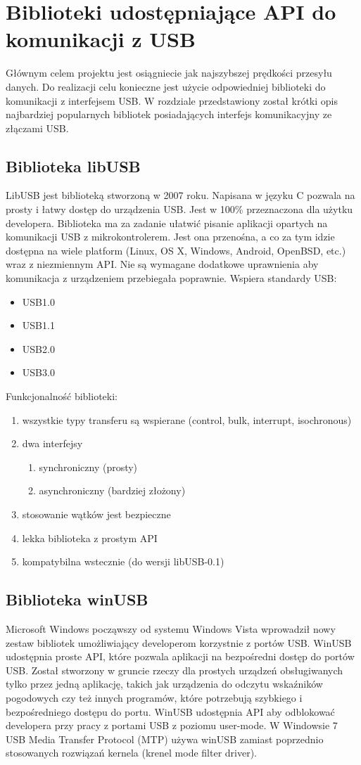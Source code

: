\documentclass{BscUS}
\begin{document}
\chapter{Biblioteki udostępniające API do komunikacji z USB}
\label{librariesChapter}
Głównym celem projektu jest osiągniecie jak najszybszej prędkości przesyłu danych. Do realizacji celu konieczne jest użycie odpowiedniej biblioteki do komunikacji z interfejsem USB. W rozdziale przedstawiony został krótki opis najbardziej popularnych bibliotek posiadających interfejs komunikacyjny ze złączami USB.
\section{Biblioteka libUSB}
LibUSB \cite{libusbDesc} jest biblioteką stworzoną w 2007 roku. Napisana w języku C  pozwala na prosty i łatwy dostęp do urządzenia USB. Jest w 100\% przeznaczona dla użytku developera. Biblioteka ma za zadanie ułatwić pisanie aplikacji opartych na komunikacji USB z mikrokontrolerem.
Jest ona przenośna, a co za tym idzie dostępna na wiele platform (Linux, OS X, Windows, Android, OpenBSD, etc.) wraz z niezmiennym API.
Nie są wymagane dodatkowe uprawnienia aby komunikacja z urządzeniem przebiegała poprawnie.
Wspiera standardy USB: 
\begin{itemize}
\item USB1.0 
\item USB1.1 
\item USB2.0 
\item USB3.0
\end{itemize}
\noindent Funkcjonalność biblioteki:
\begin{enumerate}
\item wszystkie typy transferu są wspierane (control, bulk, interrupt, isochronous)
\item dwa interfejsy
\begin{enumerate}
\item synchroniczny (prosty)
\item asynchroniczny (bardziej złożony)
\end{enumerate}
\item stosowanie wątków jest bezpieczne
\item lekka biblioteka z prostym API
\item kompatybilna wstecznie (do wersji libUSB-0.1)
\end{enumerate}
\section{Biblioteka winUSB}
Microsoft Windows począwszy od systemu Windows Vista wprowadził nowy zestaw bibliotek umożliwiający developerom korzystnie z portów USB. WinUSB udostępnia proste API, które pozwala aplikacji na bezpośredni dostęp do portów USB. Został stworzony w gruncie rzeczy dla prostych urządzeń obsługiwanych tylko przez jedną aplikację, takich jak urządzenia do odczytu wskaźników pogodowych czy też innych programów, które potrzebują szybkiego i bezpośredniego dostępu do portu. WinUSB udostępnia API aby odblokować developera przy pracy z portami USB z poziomu user-mode. W Windowsie 7 USB Media Transfer Protocol (MTP) używa winUSB zamiast poprzednio stosowanych rozwiązań kernela (krenel mode filter driver).
\end{document}
